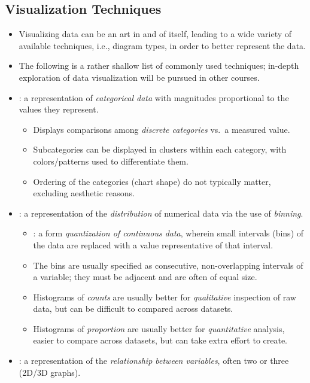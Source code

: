 \begin{itemize}
  \subsection{Visualization Techniques}
  \begin{itemize}
    \item Visualizing data can be an art in and of itself, leading to a wide variety of available techniques, i.e., diagram types, in order to better represent the data.
    \item The following is a rather shallow list of commonly used techniques; in-depth exploration of data visualization will be pursued in other courses.
    \item {}: a representation of \emph{categorical data} with magnitudes proportional to the values they represent. 
      \begin{itemize}
        \item Displays comparisons among \emph{discrete categories} vs.\ a measured value.
        \item Subcategories can be displayed in clusters within each category, with colors/patterns used to differentiate them.
        \item Ordering of the categories (chart shape) do not typically matter, excluding aesthetic reasons.
      \end{itemize}
    \item {}: a representation of the \emph{distribution} of numerical data via the use of \emph{binning}.
      \begin{itemize}
        \item {}: a form \emph{quantization of continuous data}, wherein small intervals (bins) of the data are replaced with a value representative of that interval.
        \item The bins are usually specified as consecutive, non-overlapping intervals of a variable; they must be adjacent and are often of equal size.
        \item Histograms of \emph{counts} are usually better for \emph{qualitative} inspection of raw data, but can be difficult to compared across datasets.
        \item Histograms of \emph{proportion} are usually better for \emph{quantitative} analysis, easier to compare across datasets, but can take extra effort to create.
      \end{itemize}
    \item {}: a representation of the \emph{relationship between variables}, often two or three (2D/3D graphs).

\end{itemize}
\end{itemize}
